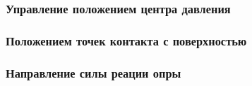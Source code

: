 \subsubsection{Управление положением центра давления}


\subsubsection{Положением точек контакта с поверхностью}


\subsubsection{Направление силы реации опры}







% 











